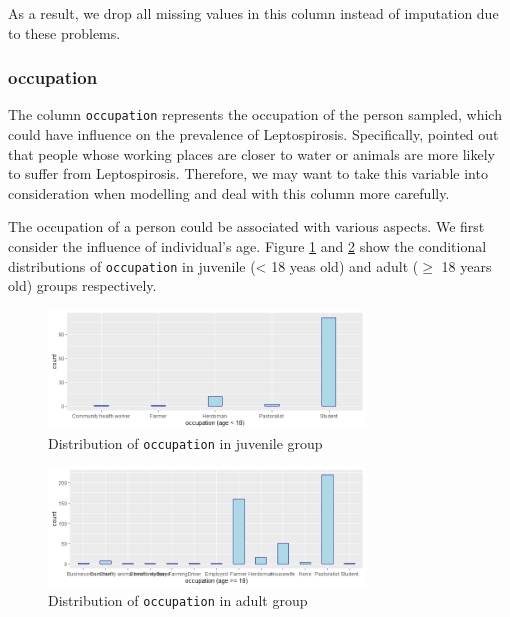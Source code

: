 \documentclass[11pt,twoside]{article}
\numberwithin{Theorem}{section}
\numberwithin{Definition}{section}
\numberwithin{Lemma}{section}
\numberwithin{Algorithm}{section}
\numberwithin{equation}{section}
\begin{document}
As a result, we drop all missing values in this column instead of imputation due to these problems.

\subsubsection{occupation}

The column \texttt{occupation} represents the occupation of the person sampled, which could have influence on the prevalence of Leptospirosis. Specifically, \cite{cook2016} pointed out that people whose working places are closer to water or animals are more likely to suffer from Leptospirosis. Therefore, we may want to take this variable into consideration when modelling and deal with this column more carefully. 

The occupation of a person could be associated with various aspects. We first consider the influence of individual's age. Figure \ref{fig:occ1} and \ref{fig:occ2} show the conditional distributions of \texttt{occupation} in juvenile (< 18 yeas old) and adult ($\geq$ 18 years old) groups respectively. 

\begin{figure}[!h]
	\centering
	\includegraphics[width = 0.75\textwidth]{Images/occupation_age_1.png}
	\caption{Distribution of \texttt{occupation} in juvenile group}
	\label{fig:occ1}
\end{figure}

\begin{figure}[!h]
	\centering
	\includegraphics[width = 0.75\textwidth]{Images/occupation_age_2.png}
	\caption{Distribution of \texttt{occupation} in adult group}
	\label{fig:occ2}
\end{figure}
\end{document}
